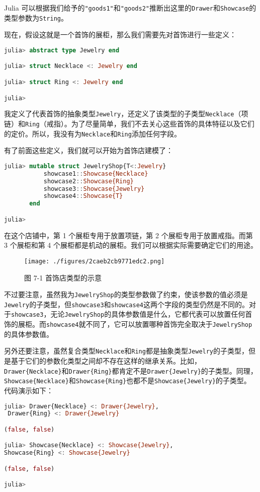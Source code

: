 Julia 可以根据我们给予的\verb|"goods1"|和\verb|"goods2"|推断出这里的\verb|Drawer|和\verb|Showcase|的类型参数为\verb|String|。

现在，假设这就是一个首饰的展柜，那么我们需要先对首饰进行一些定义：
\begin{lstlisting}[language=julia]
julia> abstract type Jewelry end

julia> struct Necklace <: Jewelry end

julia> struct Ring <: Jewelry end

julia> 
\end{lstlisting}

我定义了代表首饰的抽象类型\verb|Jewelry|，还定义了该类型的子类型\verb|Necklace|（项链）和\verb|Ring|（戒指）。为了尽量简单，我们不去关心这些首饰的具体特征以及它们的定价。所以，我没有为\verb|Necklace|和\verb|Ring|添加任何字段。

有了前面这些定义，我们就可以开始为首饰店建模了：
\begin{lstlisting}[language=julia]
julia> mutable struct JewelryShop{T<:Jewelry}
           showcase1::Showcase{Necklace}
           showcase2::Showcase{Ring}
           showcase3::Showcase{Jewelry}
           showcase4::Showcase{T}
       end

julia> 
\end{lstlisting}

在这个店铺中，第 1 个展柜专用于放置项链，第 2 个展柜专用于放置戒指。而第 3 个展柜和第 4 个展柜都是机动的展柜。我们可以根据实际需要确定它们的用途。
\begin{figure}[ht]
\centering
\texttt{[image: ./figures/2caeb2cb9771edc2.png]}
\caption{图 7-1 首饰店类型的示意} \label{fig_JuC7S1_1}
\end{figure}

不过要注意，虽然我为\verb|JewelryShop|的类型参数做了约束，使该参数的值必须是\verb|Jewelry|的子类型，但\verb|showcase3|和\verb|showcase4|这两个字段的类型仍然是不同的。对于\verb|showcase3|，无论\verb|JewelryShop|的具体参数值是什么，它都代表可以放置任何首饰的展柜。而\verb|showcase4|就不同了，它可以放置哪种首饰完全取决于\verb|JewelryShop|的具体参数值。

另外还要注意，虽然复合类型\verb|Necklace|和\verb|Ring|都是抽象类型\verb|Jewelry|的子类型，但是基于它们的参数化类型之间却不存在这样的继承关系。比如，\verb|Drawer{Necklace}|和\verb|Drawer{Ring}|都肯定不是\verb|Drawer{Jewelry}|的子类型。同理，\verb|Showcase{Necklace}|和\verb|Showcase{Ring}|也都不是\verb|Showcase{Jewelry}|的子类型。代码演示如下：
\begin{lstlisting}[language=julia]
julia> Drawer{Necklace} <: Drawer{Jewelry},
 Drawer{Ring} <: Drawer{Jewelry}

(false, false)

julia> Showcase{Necklace} <: Showcase{Jewelry}, 
Showcase{Ring} <: Showcase{Jewelry}

(false, false)

julia> 
\end{lstlisting}

